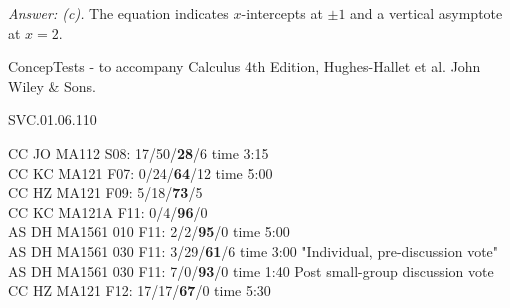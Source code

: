 {\it Answer: (c).} The equation indicates $x$-intercepts at $\pm 1$ and a vertical asymptote at $x=2$.
 

\medskip
ConcepTests - to accompany Calculus 4th Edition, Hughes-Hallet et al. John Wiley \& Sons.

SVC.01.06.110


CC JO MA112 S08: 17/50/{\bf 28}/6 time 3:15 \\ 
CC KC MA121 F07: 0/24/{\bf 64}/12 time 5:00 \\
CC HZ MA121 F09: 5/18/{\bf73}/5  \\
CC KC MA121A F11: 0/4/{\bf96}/0  \\
AS DH MA1561 010 F11: 2/2/{\bf95}/0 time 5:00  \\
AS DH MA1561 030 F11: 3/29/{\bf61}/6 time 3:00 "Individual, pre-discussion vote" \\
AS DH MA1561 030 F11: 7/0/{\bf93}/0 time 1:40 Post small-group discussion vote \\
CC HZ MA121 F12: 17/17/{\bf67}/0 time 5:30  \\
